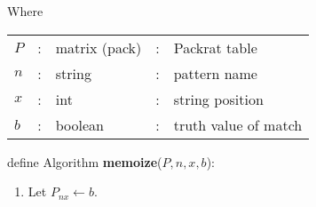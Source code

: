  \begin{framed}
  Where

  \begin{center}
   \begin{tabular}{lclcl}
    $P$ & : & matrix (pack)   & : & Packrat table \\
    $n$ & : & string          & : & pattern name \\
    $x$ & : & int             & : & string position \\
    $b$ & : & boolean         & : & truth value of match \\
   \end{tabular}
  \end{center}

 define Algorithm \textbf{memoize}($P, n, x, b$):
 
  \begin{enumerate}
   \item Let $P_{nx} \leftarrow b$.
  \end{enumerate}
 \end{framed}


